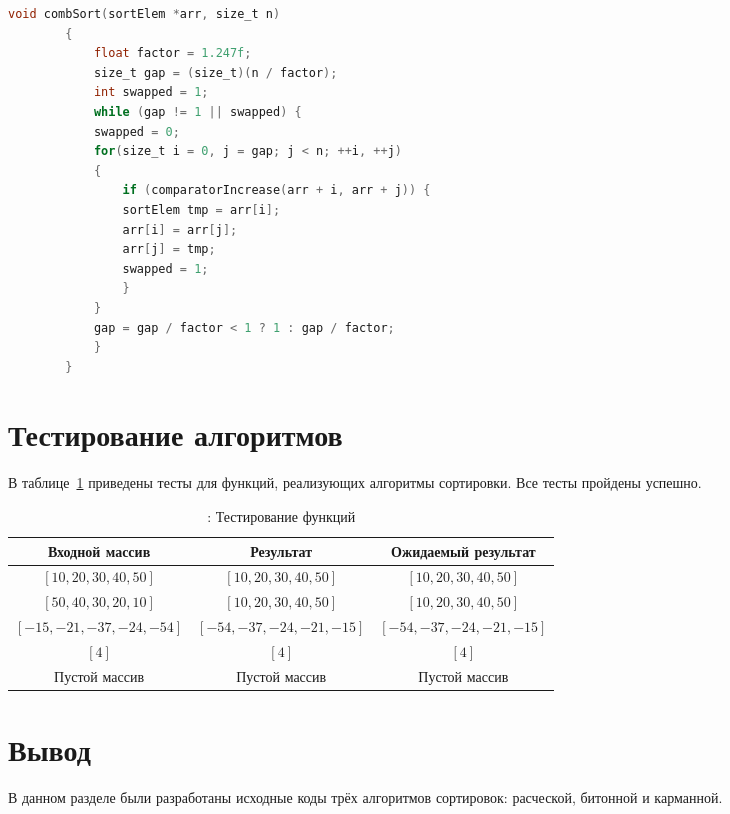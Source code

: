 \documentclass[12pt]{report}
\begin{document}
	\bigbreak

	\begin{lstlisting}[label=insertion-code,caption=Листинг сортировки расческой,language=C]
		void combSort(sortElem *arr, size_t n)
		{
		    float factor = 1.247f;
		    size_t gap = (size_t)(n / factor);
		    int swapped = 1;
		    while (gap != 1 || swapped) {
			swapped = 0;
			for(size_t i = 0, j = gap; j < n; ++i, ++j)
			{
			    if (comparatorIncrease(arr + i, arr + j)) {
				sortElem tmp = arr[i];
				arr[i] = arr[j];
				arr[j] = tmp;
				swapped = 1;
			    }
			}
			gap = gap / factor < 1 ? 1 : gap / factor;
		    }
		}
	\end{lstlisting}

	\section{Тестирование алгоритмов}

	В таблице~\ref{tbl:test} приведены тесты для функций, реализующих алгоритмы сортировки. Все тесты пройдены успешно.
	
	\begin{table}[h!]
		\begin{center}
			\caption{\label{tbl:test}: Тестирование функций}
			\begin{tabular}{|c|c|c|}
				\hline
				Входной массив & Результат & Ожидаемый результат \\ 
				\hline
				$[10, 20, 30, 40, 50]$ & $[10, 20, 30, 40, 50]$  & $[10, 20, 30, 40, 50]$\\\hline
				$[50, 40, 30, 20, 10]$  & $[10, 20, 30, 40, 50]$ & $[10, 20, 30, 40, 50]$\\\hline
				$[-15, -21, -37, -24, -54]$  & $[-54, -37, -24, -21, -15]$  & $[-54, -37, -24, -21, -15]$\\\hline
				$[4]$  & $[4]$  & $[4]$\\\hline
				Пустой массив  & Пустой массив  & Пустой массив\\
				\hline
			\end{tabular}			
		\end{center}
	\end{table}

	\section*{Вывод}
	
	В данном разделе были разработаны исходные коды трёх алгоритмов сортировок: расческой, битонной и карманной.
	
\end{document}
